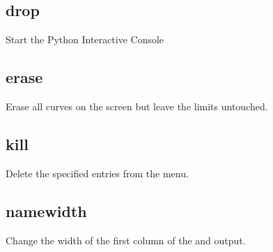 \documentclass[letterpaper,10pt,english]{sphinxmanual}
\begin{document}
\begin{sphinxVerbatim}[commandchars=\\\{\}]
\PYG{p}{[}\PYG{p}{]}    
\end{sphinxVerbatim}


\subsection{drop}
\label{\detokenize{env_control_cmds:drop}}
Start the Python Interactive Console

\begin{sphinxVerbatim}[commandchars=\\\{\}]
\PYG{p}{[}\PYG{p}{]} 
\end{sphinxVerbatim}


\subsection{erase}
\label{\detokenize{env_control_cmds:erase}}
Erase all curves on the screen but leave the limits untouched. 

\begin{sphinxVerbatim}[commandchars=\\\{\}]
\PYG{p}{[}\PYG{p}{]} 
\end{sphinxVerbatim}


\subsection{kill}
\label{\detokenize{env_control_cmds:kill}}
Delete the specified entries from the menu.

\begin{sphinxVerbatim}[commandchars=\\\{\}]
\PYG{p}{[}\PYG{p}{]}  \PYG{p}{[}  \PYG{p}{]}
\end{sphinxVerbatim}


\subsection{namewidth}
\label{\detokenize{env_control_cmds:namewidth}}
Change the width of the first column of the  and  output.
\end{document}
